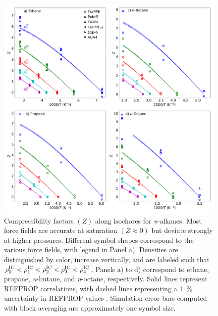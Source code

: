 \documentclass[preprint,letterpaper,floatfix,citeautoscript,aip,jcp]{revtex4-1}
\begin{document}
\begin{figure}[p!]
	\centering
	\includegraphics[width=6.4in]{IC_normal_alkanes_all_models}
	\caption{Compressibility factors $(Z)$ along isochores for \textit{n}-alkanes. Most force fields are accurate at saturation $(Z \approx 0)$ but deviate strongly at higher pressures. Different symbol shapes correspond to the various force fields, with legend in Panel a). Densities are distinguished by color, increase vertically, and are labeled such that $\rho^{\rm IC}_0 < \rho^{\rm IC}_1 < \rho^{\rm IC}_2 < \rho^{\rm IC}_3 < \rho^{\rm IC}_4$. Panels a) to d) correspond to ethane, propane, \textit{n}-butane, and \textit{n}-octane, respectively.
Solid lines represent REFPROP correlations, with dashed lines representing a 1~\% uncertainty in REFPROP values \cite{LEMMON-RP91,Ethane2006,Propane2009,Butane2006,Beckmueller2017}. Simulation error bars computed with block averaging are approximately one symbol size.}
	\label{fig:IC_normal_alkanes}
\end{figure}
\end{document}

